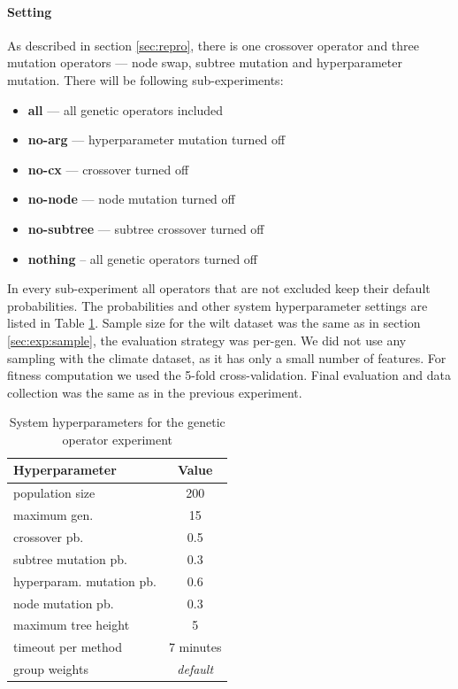 \paragraph{Setting}

As described in section \ref{sec:repro}, there is one crossover operator and
three mutation operators --- node swap, subtree mutation and hyperparameter
mutation. There will be following sub-experiments:
\begin{itemize}
\setlength\itemsep{0.3em}
\item \textbf{all} --- all genetic operators included
\item \textbf{no-arg} --- hyperparameter mutation turned off
\item \textbf{no-cx} --- crossover turned off
\item \textbf{no-node} --- node mutation turned off
\item \textbf{no-subtree} --- subtree crossover turned off
\item \textbf{nothing} -- all genetic operators turned off
\end{itemize}
In every sub-experiment all operators that are not excluded keep their default
probabilities. The probabilities and other system hyperparameter
settings are listed in Table \ref{tab04:exp2:setting}.
Sample size for the wilt dataset was the same as in section
\ref{sec:exp:sample}, the evaluation strategy was per-gen. We did not use any
sampling with the climate dataset, as it has only a small number of features.
For fitness computation we used the 5-fold cross-validation. Final evaluation
and data collection was the same as in the previous experiment.

\begin{table}[ht]
\centering
\caption{System hyperparameters for the genetic operator experiment}\label{tab04:exp2:setting}
\begin{tabular}{l c}
\toprule
\textbf{\upshape Hyperparameter} & \textbf{Value} \\
\midrule
population size & 200 \\
maximum gen. & 15 \\
crossover pb. & 0.5 \\
subtree mutation pb. & 0.3 \\
hyperparam. mutation pb. & 0.6 \\
node mutation pb. & 0.3 \\
maximum tree height & 5 \\
timeout per method  & 7 minutes \\
group weights & \textit{default} \\
\bottomrule

\end{tabular}

\end{table}

